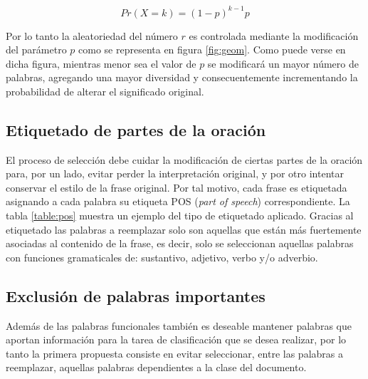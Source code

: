 \begin{equation} \label{eq:geom}
    Pr(X=k)=(1-p)^{k-1}p
\end{equation}

Por lo tanto la aleatoriedad del número $r$ es controlada mediante la modificación del parámetro $p$ como se representa en figura \ref{fig:geom}. Como puede verse en dicha figura, mientras menor sea el valor de $p$ se modificará un mayor número de palabras, agregando una mayor diversidad  y consecuentemente incrementando la probabilidad de alterar el significado original. 


\subsection{Etiquetado de partes de la oración}

El proceso de selección debe cuidar la modificación de ciertas partes de la oración para, por un lado, evitar perder la interpretación original, y por otro intentar conservar el estilo de la frase original. Por tal motivo, cada frase es etiquetada asignando a cada palabra su etiqueta POS (\textit{part of speech}) correspondiente. La tabla \ref{table:pos} muestra un ejemplo del tipo de etiquetado aplicado. Gracias al etiquetado las palabras a reemplazar solo son aquellas que están más fuertemente asociadas al contenido de la frase, es decir, solo se seleccionan aquellas palabras con funciones gramaticales de: sustantivo, adjetivo, verbo y/o adverbio.



\subsection{Exclusión de palabras importantes}


Además de las palabras funcionales también es deseable mantener palabras que aportan información para la tarea de clasificación que se desea realizar, por lo tanto la primera propuesta consiste en evitar seleccionar, entre las palabras a reemplazar, aquellas  palabras dependientes a la clase del documento. 

